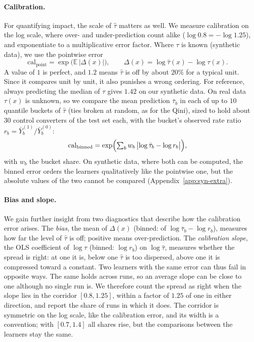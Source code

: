 \documentclass{article}
\begin{document}
\paragraph{Calibration.}
For quantifying impact, the scale of $\hat\tau$ matters as well. We measure
calibration on the log scale, where over- and under-prediction count alike
($\log 0.8 = -\log 1.25$), and exponentiate to a multiplicative error factor.
Where $\tau$ is known (synthetic data), we use the pointwise error
\begin{equation}
\label{eq:cal-point-v2}
  \mathrm{cal}_{\text{point}} = \exp\bigl(\mathbb{E}\,|\Delta(x)|\bigr),
  \qquad \Delta(x) = \log\hat\tau(x) - \log\tau(x).
\end{equation}
A value of $1$ is perfect, and $1.2$ means $\hat\tau$ is off by about $20\%$
for a typical unit. Since it compares unit by unit, it also punishes a
wrong ordering. For reference, always predicting the median of $\tau$
gives $1.42$ on our synthetic data. On real data $\tau(x)$ is unknown, so we compare the mean
prediction $\bar\tau_b$ in each of up to $10$ quantile buckets of $\hat\tau$
(ties broken at random, as for the Qini),
sized to hold about $30$ control converters of the test set each, with the
bucket's observed rate ratio $r_b = \bar Y^{(1)}_b / \bar Y^{(0)}_b$:
\begin{equation}
\label{eq:cal-binned-v2}
  \mathrm{cal}_{\text{binned}} = \exp\Bigl(\textstyle\sum_b w_b\,
  \bigl|\log\bar\tau_b - \log r_b\bigr|\Bigr),
\end{equation}
with $w_b$ the bucket share. On synthetic data, where both can be computed,
the binned error orders the learners qualitatively like the pointwise one,
but the absolute values of the two cannot be compared
(Appendix~\ref{app:syn-extra}).

\paragraph{Bias and slope.}
We gain further insight from two diagnostics that describe how the
calibration error arises. The \emph{bias}, the mean of $\Delta(x)$ (binned: of
$\log\bar\tau_b - \log r_b$), measures how far the level of $\hat\tau$ is off;
positive means over-prediction. The \emph{calibration slope}, the OLS
coefficient of $\log\tau$ (binned: $\log r_b$) on $\log\hat\tau$, measures
whether the spread is right: at one it is, below one $\hat\tau$ is too
dispersed, above one it is compressed toward a constant. Two learners with the
same error can thus fail in opposite ways. The same holds across runs, so an
average slope can be close to one although no single run is. We therefore
count the spread as right when the slope lies in the corridor $[0.8, 1.25]$,
within a factor of $1.25$ of one in either direction, and report the share of
runs in which it does. The corridor is symmetric on the log scale, like the
calibration error, and its width is a convention; with $[0.7, 1.4]$ all
shares rise, but the comparisons between the learners stay the same.
\end{document}
